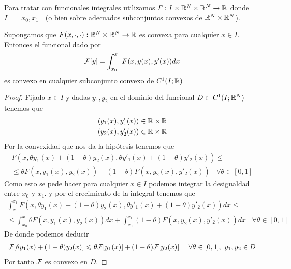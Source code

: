Para tratar con funcionales integrales utilizamos $F:I\times \mathbb{R}^N \times \mathbb{R}^N \to \mathbb{R}$ donde $I=[x_0,x_1]$ (o bien sobre adecuados subconjuntos convexos de $\mathbb{R}^N \times \mathbb{R}^N$).

\begin{lema}
    Supongamos que $F(x,\cdot,\cdot):\mathbb{R}^N \times \mathbb{R}^N \to \mathbb{R}$ es convexa para cualquier $x\in I$. Entonces el funcional dado por 
    \begin{gather*}
        \mathcal{F}[y] = \int_{x_0}^{x_1} F(x,y(x),y'(x)) dx
    \end{gather*}
    es convexo en cualquier subconjunto convexo de $C^1(I;\mathbb{R})$
    \begin{proof}
        Fijado $x\in I$ y dadas $y_1,y_2$ en el dominio del funcional $D\subset C^1(I;\mathbb{R}^N)$ tenemos que 
        \begin{gather*}
            (y_1(x), y_1'(x)) \in \mathbb{R}\times \mathbb{R}\\
            (y_2(x), y_2'(x)) \in \mathbb{R}\times \mathbb{R}
        \end{gather*}
        Por la convexidad que nos da la hipótesis tenemos que 
        \begin{gather*}
            F(x, \theta y_1(x) + (1-\theta) y_2(x), \theta y'_1(x) + (1-\theta) y'_2(x)) \leq\\
            \leq \theta F(x, y_1(x), y_2(x)) + (1-\theta) F(x, y_2(x), y'_2(x)) \ \ \ \ \forall  \theta \in [0,1]
        \end{gather*}
        Como esto se pede hacer para cualquier $x\in I$ podemos integrar la desigualdad entre $x_0$ y $x_1$. y por el crecimiento de la integral tenemos que 
        \begin{gather*}
            \int_{x_0}^{x_1} F(x, \theta y_1(x) + (1-\theta) y_2(x), \theta y'_1(x) + (1-\theta) y'_2(x)) dx \leq\\
            \leq \int_{x_0}^{x_1} \theta F(x, y_1(x), y_2(x))dx + \int_{x_0}^{x_1}(1-\theta) F(x, y_2(x), y'_2(x)) dx\ \ \ \ \forall  \theta \in [0,1]
        \end{gather*}
        De donde podemos deducir
        \begin{gather*}
            \mathcal{F}[\theta y_1(x) + (1-\theta) y_2(x)] \leqslant \theta \mathcal{F}[y_1(x)] + (1-\theta) \mathcal{F}[y_2(x)] \ \ \ \ \forall \theta \in [0,1],\ y_1,y_2\in D
        \end{gather*}
        Por tanto $\mathcal{F}$ es convexo en $D$.
    \end{proof}
\end{lema}

